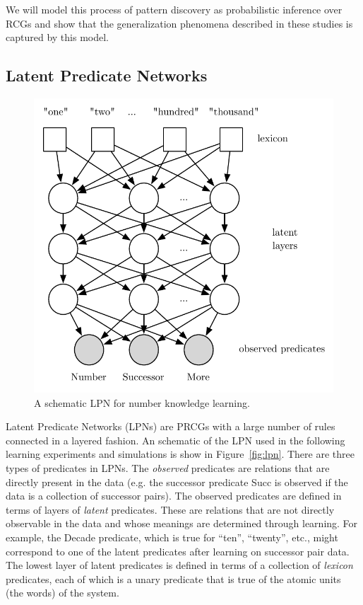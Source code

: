 \documentclass[10pt,letterpaper]{article}
\begin{document}
We will model this process of pattern discovery as probabilistic
inference over RCGs and show that the generalization phenomena
described in these studies is captured by this model. 

\subsection{Latent Predicate Networks}

\begin{figure}[t]
  \begin{centering}
    \includegraphics[width=0.9\linewidth]{figures/lpn}
    \caption{A schematic LPN for number knowledge learning.}
  \end{centering}
\end{figure}

Latent Predicate Networks (LPNs) are PRCGs with a large number of
rules connected in a layered fashion. An schematic of the LPN used in
the following learning experiments and simulations is show in
Figure~\ref{fig:lpn}. There are three types of predicates in LPNs. The
\emph{observed} predicates are relations that are directly present in
the data (e.g. the successor predicate Succ is observed if the data is
a collection of successor pairs). The observed predicates are defined
in terms of layers of \emph{latent} predicates. These are relations
that are not directly observable in the data and whose meanings are
determined through learning. For example, the Decade predicate, which
is true for ``ten'', ``twenty'', etc., might correspond to one of the
latent predicates after learning on successor pair data. The lowest
layer of latent predicates is defined in terms of a collection of
\emph{lexicon} predicates, each of which is a unary predicate that is
true of the atomic units (the words) of the system.
\end{document}
